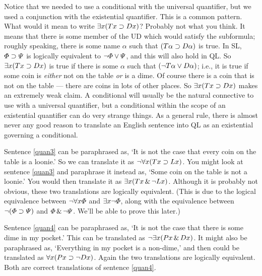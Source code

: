 Notice that we needed to use a conditional with the universal quantifier, but we used a conjunction with the existential quantifier. This is a common pattern. What would it mean to write $\exists x(Tx \supset Dx)$? Probably not what you think. It means that there is some member of the UD which would satisfy the subformula; roughly speaking, there is some name $\alpha$ such that $(T\alpha \supset D\alpha)$ is true. In SL, $\varPhi{} \supset \varPsi{}$ is logically equivalent to $\neg\varPhi{} \vee \varPsi{}$, and this will also hold in QL. So $\exists x(Tx \supset Dx)$ is true if there is some $\alpha$ such that $(\neg T\alpha \vee D\alpha)$; i.e., it is true if some coin is \emph{either} not on the table \emph{or} is a dime. Of course there is a coin that is not on the table --- there are coins in lots of other places. So $\exists x(Tx \supset Dx)$ makes an extremely weak claim. A conditional will usually be the natural connective to use with a universal quantifier, but a conditional within the scope of an existential quantifier can do very strange things. As a general rule, there is almost never any good reason to translate an English sentence into QL as an existential governing a conditional.

Sentence \ref{quan3} can be paraphrased as, `It is not the case that every coin on the table is a loonie.' So we can translate it as $\neg \forall x(Tx \supset Lx)$. You might look at sentence \ref{quan3} and paraphrase it instead as, `Some coin on the table is not a loonie.' You would then translate it as $\exists x(Tx \,\&\, \neg Lx)$. Although it is probably not obvious, these two translations are logically equivalent. (This is due to the logical equivalence between $\neg\forall x\varPhi{}$ and $\exists x\neg\varPhi{}$, along with the equivalence between $\neg(\varPhi{}\supset\varPsi{})$ and $\varPhi{}\,\&\,\neg\varPsi{}$. We'll be able to prove this later.)

Sentence \ref{quan4} can be paraphrased as, `It is not the case that there is some dime in my pocket.' This can be translated as $\neg\exists x(Px \,\&\, Dx)$. It might also be paraphrased as, `Everything in my pocket is a non-dime,' and then could be translated as $\forall x(Px \supset \neg Dx)$. Again the two translations are logically equivalent. Both are correct translations of sentence \ref{quan4}.

